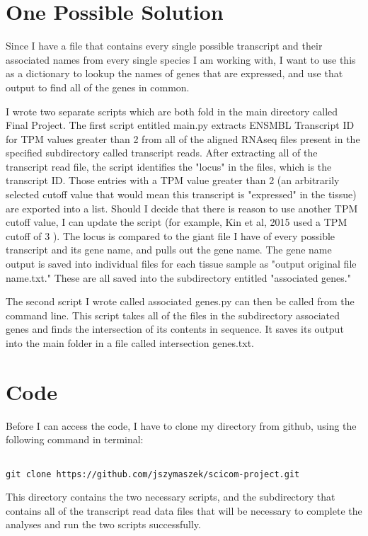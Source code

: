 \documentclass[12pt]{article}
\begin{document}
    \section{One Possible Solution}
    
    	Since I have a file that contains every single possible transcript and their associated names from every single species I am working with, I want to use this as a dictionary to lookup the names of genes that are expressed, and use that output to find all of the genes in common.
	
	I wrote two separate scripts which are both fold in the main directory called Final Project. The first script entitled main.py extracts ENSMBL Transcript ID for TPM values greater than 2 from all of the aligned RNAseq files present in the specified subdirectory called transcript reads. After extracting all of the transcript read file, the script identifies the "locus" in the files, which is the transcript ID. Those entries with a TPM value greater than 2 (an arbitrarily selected cutoff value that would mean this transcript is "expressed" in the tissue) are exported into a list. Should I decide that there is reason to use another TPM cutoff value, I can update the script (for example, Kin et al, 2015 used a TPM cutoff of 3 \cite{kin2015cell}). The locus is compared to the giant file I have of every possible transcript and its gene name, and pulls out the gene name. The gene name output is saved into individual files for each tissue sample as "output original file name.txt." These are all saved into the subdirectory entitled "associated genes." 
	
	The second script I wrote called associated genes.py can then be called from the command line. This script takes all of the files in the subdirectory associated genes and finds the intersection of its contents in sequence. It saves its output into the main folder in a file called intersection genes.txt.

    
    \section{Code}
	Before I can access the code, I have to clone my directory from github, using the following command in terminal: 
	\begin{mdframed}[backgroundcolor=light-gray, roundcorner=10pt,leftmargin=1, rightmargin=1, innerleftmargin=15, innertopmargin=15,innerbottommargin=15, outerlinewidth=1, linecolor=light-gray]
\begin{lstlisting}

git clone https://github.com/jszymaszek/scicom-project.git

	\end{lstlisting}
	\end{mdframed}	
This directory contains the two necessary scripts, and the subdirectory that contains all of the transcript read data files that will be necessary to complete the analyses and run the two scripts successfully.
\end{document}
